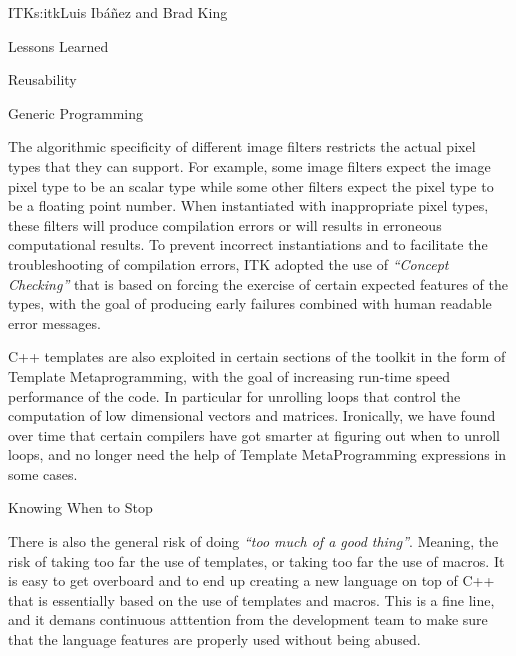 \begin{aosachapter}{ITK}{s:itk}{Luis Ib\'{a}\~{n}ez and Brad King}
\begin{aosasect1}{Lessons Learned}
\begin{aosasect2}{Reusability}
\begin{aosasect3}{Generic Programming}
\begin{aosaitemize}
\item {}
\item {}
\end{aosaitemize}

The algorithmic specificity of different image filters restricts the actual
pixel types that they can support. For example, some image filters expect the
image pixel type to be an scalar type while some other filters expect the pixel
type to be a floating point number. When instantiated with inappropriate pixel
types, these filters will produce compilation errors or will results in
erroneous computational results. To prevent incorrect instantiations and to
facilitate the troubleshooting of compilation errors, ITK adopted the use of
\emph{``Concept Checking''} that is based on forcing the exercise of certain
expected features of the types, with the goal of producing early failures
combined with human readable error messages.

C++ templates are also exploited in certain sections of the toolkit in the form
of Template Metaprogramming, with the goal of increasing run-time speed
performance of the code. In particular for unrolling loops that control the
computation of low dimensional vectors and matrices. Ironically, we have found
over time that certain compilers have got smarter at figuring out when to
unroll loops, and no longer need the help of Template MetaProgramming
expressions in some cases.

\end{aosasect3}


\begin{aosasect3}{Knowing When to Stop}

There is also the general risk of doing \emph{``too much of a good thing''}.
Meaning, the risk of taking too far the use of templates, or taking too far the
use of macros. It is easy to get overboard and to end up creating a new
language on top of C++ that is essentially based on the use of templates and
macros. This is a fine line, and it demans continuous atttention from the
development team to make sure that the language features are properly used
without being abused.


\end{aosasect3}
\end{aosasect2}
\end{aosasect1}
\end{aosachapter}
